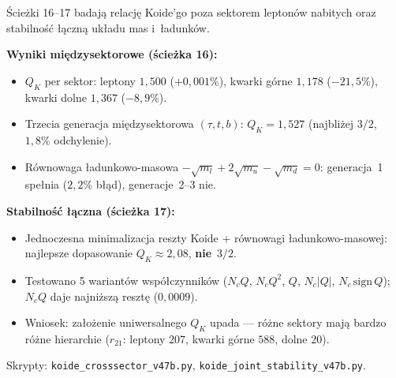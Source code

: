 \begin{remark}%
\label{rem:T-crosssector-joint}
\'Scie\.zki 16--17 badaj\k{a} relacj\k{e} Koide'go
poza sektorem lepton\'ow nabitych oraz stabilno\'s\'c
\l{}\k{a}czn\k{a} uk\l{}adu mas i~\l{}adunk\'ow.

\medskip\noindent
\textbf{Wyniki mi\k{e}dzysektorowe (\'scie\.zka 16):}
\begin{itemize}[nosep]
  \item $Q_K$ per sektor: leptony $1{,}500$ ($+0{,}001\%$),
    kwarki g\'orne $1{,}178$ ($-21{,}5\%$),
    kwarki dolne $1{,}367$ ($-8{,}9\%$).
  \item Trzecia generacja mi\k{e}dzysektorowa $(\tau, t, b)$:
    $Q_K = 1{,}527$ (najbli\.zej $3/2$, $1{,}8\%$ odchylenie).
  \item R\'ownowaga \l{}adunkowo-masowa
    $-\sqrt{m_l} + 2\sqrt{m_u} - \sqrt{m_d} = 0$:
    generacja~1 spe\l{}nia ($2{,}2\%$ b\l{}\k{a}d), generacje~2--3 nie.
\end{itemize}

\medskip\noindent
\textbf{Stabilno\'s\'c \l{}\k{a}czna (\'scie\.zka 17):}
\begin{itemize}[nosep]
  \item Jednoczesna minimalizacja reszty Koide + r\'ownowagi
    \l{}adunkowo-masowej: najlepsze dopasowanie $Q_K \approx 2{,}08$,
    \textbf{nie}~$3/2$.
  \item Testowano 5 wariant\'ow wsp\'o\l{}czynnik\'ow
    ($N_c Q$, $N_c Q^2$, $Q$, $N_c |Q|$, $N_c\,\mathrm{sign}\,Q$);
    $N_c Q$ daje najni\.zsz\k{a} reszt\k{e} ($0{,}0009$).
  \item Wniosek: za\l{}o\.zenie uniwersalnego $Q_K$ upada
    --- r\'o\.zne sektory maj\k{a} bardzo r\'o\.zne hierarchie
    ($r_{21}$: leptony $207$, kwarki g\'orne $588$, dolne $20$).
\end{itemize}
Skrypty: \texttt{koide\_crosssector\_v47b.py},
\texttt{koide\_joint\_stability\_v47b.py}.
\end{remark}

